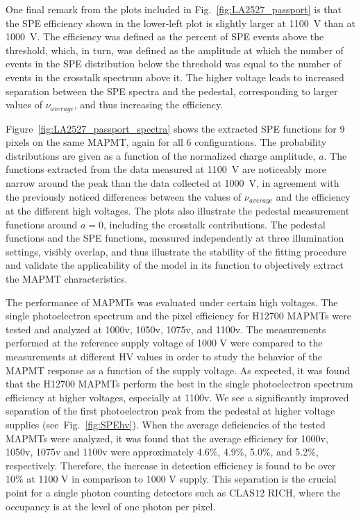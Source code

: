 One final remark from the plots included in Fig.~\ref{fig:LA2527_passport} is that the SPE efficiency shown in the lower-left plot is slightly larger at 1100~V than at 1000~V. The efficiency was defined as the percent of SPE events above the threshold, which, in turn, was defined as the amplitude at which the number of events in the SPE distribution below the threshold was equal to the number of events in the crosstalk spectrum above it. The higher voltage leads to increased separation between the SPE spectra and the pedestal, corresponding to larger values of $\nu_{average}$, and thus increasing the efficiency. 

Figure~\ref{fig:LA2527_passport_spectra} shows the extracted SPE functions for 9 pixels on the same MAPMT, again for all 6 configurations. The probability distributions are given as a function of the normalized charge amplitude, $a$. The functions extracted from the data measured at 1100~V are noticeably more narrow around the peak than the data collected at 1000~V, in agreement with the previously noticed differences between the values of $\nu_{average}$ and the efficiency at the different high voltages. The plots also illustrate the pedestal measurement functions around $a=0$, including the crosstalk contributions. The pedestal functions and the SPE functions, measured independently at three illumination settings, visibly overlap, and thus illustrate the stability of the fitting procedure and validate the applicability of the model in its function to objectively extract the MAPMT characteristics.


\iffalse
The performance of MAPMTs was evaluated under certain high voltages.
The single photoelectron spectrum and the pixel efficiency for H12700 MAPMTs were tested and analyzed at 1000v, 1050v, 1075v, and 1100v.
The measurements performed at the reference supply voltage of 1000 V were compared to the measurements at different HV values in order to study the behavior of the MAPMT response as a function of the supply voltage.
As expected, it was found that the H12700 MAPMTs perform the best in the single photoelectron spectrum efficiency at higher voltages, especially at 1100v.
We see a significantly improved separation of the first photoelectron peak from the pedestal at higher voltage supplies (see~Fig.~\ref{fig:SPEhv}).
When the average deficiencies of the tested MAPMTs were analyzed, it was found that the average efficiency for 1000v, 1050v, 1075v and 1100v were approximately 4.6\%, 4.9\%, 5.0\%, and 5.2\%, respectively.
Therefore, the increase in detection efficiency is found to be over 10\% at 1100 V in comparison to 1000 V supply.
This separation is the crucial point for a single photon counting detectors such as CLAS12 RICH, where the occupancy is at the level of one photon per pixel.




